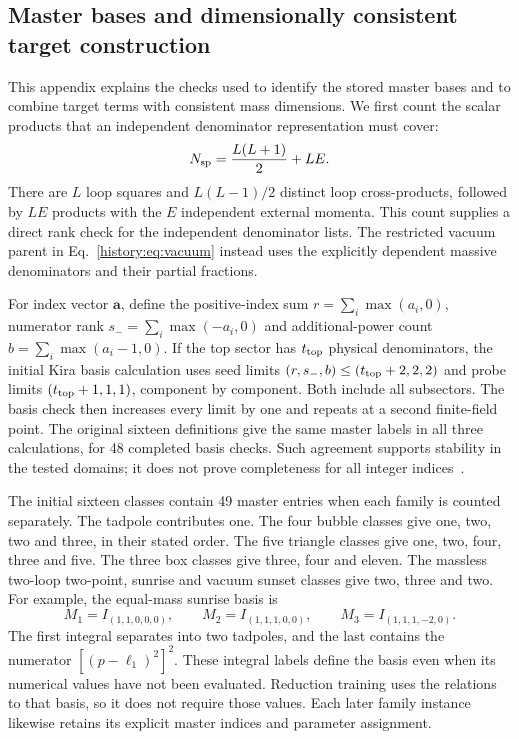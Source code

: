 \subsection{Master bases and dimensionally consistent target construction}
\label{history:app:basis}
This appendix explains the checks used to identify the stored master bases and to combine target terms with consistent mass dimensions. We first count the scalar products that an independent denominator representation must cover:
\begin{equation}
 N_{\rm sp}=\frac{L(L+1)}2+LE.
\end{equation}
There are $L$ loop squares and $L(L-1)/2$ distinct loop cross-products, followed by $LE$ products with the $E$ independent external momenta. This count supplies a direct rank check for the independent denominator lists. The restricted vacuum parent in Eq.~\eqref{history:eq:vacuum} instead uses the explicitly dependent massive denominators and their partial fractions.

For index vector $\boldsymbol a$, define the positive-index sum $r=\sum_i\max(a_i,0)$, numerator rank $s_-=\sum_i\max(-a_i,0)$ and additional-power count $b=\sum_i\max(a_i-1,0)$. If the top sector has $t_{\rm top}$ physical denominators, the initial Kira basis calculation uses seed limits $(r,s_-,b)\leq(t_{\rm top}+2,2,2)$ and probe limits $(t_{\rm top}+1,1,1)$, component by component. Both include all subsectors. The basis check then increases every limit by one and repeats at a second finite-field point. The original sixteen definitions give the same master labels in all three calculations, for 48 completed basis checks. Such agreement supports stability in the tested domains; it does not prove completeness for all integer indices~\cite{KiraOriginal,Kira3}.

The initial sixteen classes contain 49 master entries when each family is counted separately. The tadpole contributes one. The four bubble classes give one, two, two and three, in their stated order. The five triangle classes give one, two, four, three and five. The three box classes give three, four and eleven. The massless two-loop two-point, sunrise and vacuum sunset classes give two, three and two. For example, the equal-mass sunrise basis is
\begin{equation}
 M_1=I_{(1,1,0,0,0)},\qquad M_2=I_{(1,1,1,0,0)},\qquad
 M_3=I_{(1,1,1,-2,0)}.
\end{equation}
The first integral separates into two tadpoles, and the last contains the numerator $[(p-\ell_1)^2]^2$. These integral labels define the basis even when its numerical values have not been evaluated. Reduction training uses the relations to that basis, so it does not require those values. Each later family instance likewise retains its explicit master indices and parameter assignment.

